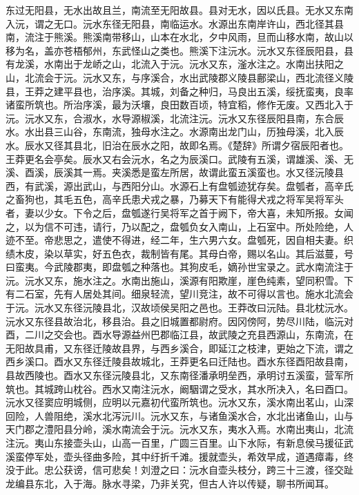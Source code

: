\documentclass[12pt,UTF8]{ctexbook}
\begin{document}
东过无阳县，无水出故且兰，南流至无阳故县。县对无水，因以氏县。无水又东南入沅，谓之无口。沅水东径无阳县，南临运水。水源出东南岸许山，西北径其县南，流注于熊溪。熊溪南带移山，山本在水北，夕中风雨，旦而山移水南，故山以移为名，盖亦苍梧郁州，东武怪山之类也。熊溪下注沅水。沅水又东径辰阳县，县有龙溪，水南出于龙峤之山，北流入于沅。沅水又东，滏水注之。水南出扶阳之山，北流会于沅。沅水又东，与序溪合，水出武陵郡义陵县鄜梁山，西北流径义陵县，王莽之建平县也，治序溪。其城，刘备之种归，马良出五溪，绥抚蛮夷，良率诸蛮所筑也。所治序溪，最为沃壤，良田数百顷，特宜稻，修作无废。又西北入于沅。沅水又东，合淑水，水导源椒溪，北流注沅。沅水又东径辰阳县南，东合辰水。水出县三山谷，东南流，独母水注之。水源南出龙门山，历独母溪，北入辰水。辰水又径其县北，旧治在辰水之阳，故即名焉。《楚辞》所谓夕宿辰阳者也。王莽更名会亭矣。辰水又右会沅水，名之为辰溪口。武陵有五溪，谓雄溪、溪、无溪、酉溪，辰溪其一焉。夹溪悉是蛮左所居，故谓此蛮五溪蛮也。水又径沅陵县西，有武溪，源出武山，与西阳分山。水源石上有盘瓠迹犹存矣。盘瓠者，高辛氏之畜狗也，其毛五色，高辛氏患犬戎之暴，乃募天下有能得犬戎之将军吴将军头者，妻以少女。下令之后，盘瓠遂行吴将军之首于阙下，帝大喜，未知所报。女闻之，以为信不可违，请行，乃以配之，盘瓠负女入南山，上石室中。所处险绝，人迹不至。帝悲思之，遣使不得进，经二年，生六男六女。盘瓠死，因自相夫妻。织绩木皮，染以草实，好五色衣，裁制皆有尾。其母白帝，赐以名山。其后滋蔓，号曰蛮夷。今武陵郡夷，即盘瓠之种落也。其狗皮毛，嫡孙世宝录之。武水南流注于沅。沅水又东，施水注之。水南出施山，溪源有阳欺崖，崖色纯素，望同积雪。下有二石室，先有人居处其间。细泉轻流，望川竞注，故不可得以言也。施水北流会于沅。沅水又东径沅陵县北，汉故顷侯吴阳之邑也。王莽改曰沅陆。县北枕沅水。沅水又东径县故治北，移县治。县之旧城置都尉府。因冈傍阿，势尽川陆，临沅对酉，二川之交会也。酉水导源益州巴郡临江县，故武陵之充县西源山，东南流，在无阳故具甫，又东径迁陵故县界，与西乡溪合，即延江之枝津，更始之下流，谓之西乡溪口。酉水又东径迁陵县故城北，王莽更名曰迁陆也。酉水东径酉阳故县南，县故西陵也。酉水又东径沅陵县北，又东南径潘承明垒西，承明讨五溪蛮，营军所筑也。其城跨山枕谷。西水又南注沅水，阚駰谓之受水，其水所决入，名曰酉口。沅水又径窦应明城侧，应明以元嘉初代蛮所筑也。沅水又东，溪水南出茗山，山深回险，人兽阻绝，溪水北泻沅川。沅水又东，与诸鱼溪水合，水北出诸鱼山，山与天门郡之澧阳县分岭，溪水南流会于沅。沅水又东，夷水入焉。水南出夷山，北流注沅。夷山东接壶头山，山高一百里，广圆三百里。山下水际，有新息侯马援征武溪蛮停军处，壶头径曲多险，其中纡折千滩。援就壶头，希效早成，道遇瘴毒，终没于此。忠公获谤，信可悲矣！刘澄之曰：沅水自壶头枝分，跨三十三渡，径交趾龙编县东北，入于海。脉水寻梁，乃非关究，但古人许以传疑，聊书所闻耳。
\end{document}

